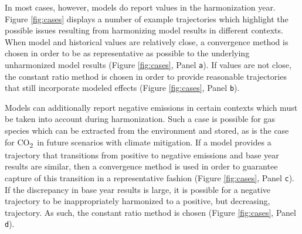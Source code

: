\documentclass[review]{elsarticle}
\newcommand{\code}[1]{\lstinline[basicstyle=\ttfamily\color{black}]|#1|}
\newcommand{\cotwo}{CO\textsubscript{2}~}
\begin{document}
In most cases, however, models do report values in the harmonization
year. Figure \ref{fig:cases} displays a number of example trajectories which
highlight the possible issues resulting from harmonizing model results in
different contexts. When model and historical values are relatively close, a
convergence method is chosen in order to be as representative as possible to the
underlying unharmonized model results (Figure \ref{fig:cases}, Panel
\code{a}). If values are not close, the constant ratio method is chosen in order
to provide reasonable trajectories that still incorporate modeled effects
(Figure \ref{fig:cases}, Panel \code{b}). 

Models can additionally report negative emissions in certain contexts which must
be taken into account during harmonization. Such a case is possible for gas
species which can be extracted from the environment and stored, as is the case
for \cotwo in future scenarios with climate mitigation. If a model provides a
trajectory that transitions from positive to negative emissions and base year
results are similar, then a convergence method is used in order to guarantee
capture of this transition in a representative fashion (Figure \ref{fig:cases},
Panel \code{c}). If the discrepancy in base year results is large, it is
possible for a negative trajectory to be inappropriately harmonized to a
positive, but decreasing, trajectory. As such, the constant ratio method is
chosen (Figure \ref{fig:cases}, Panel \code{d}).
\end{document}
